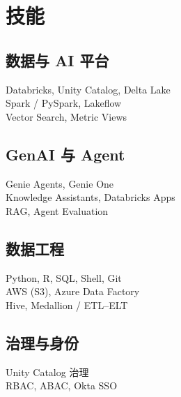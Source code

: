 \documentclass[letterpaper]{deedy-resume}
\begin{document}


\begin{minipage}[t]{0.33\textwidth}

\section{技能}
\vspace{1mm}

\subsection{数据与 AI 平台}
Databricks, Unity Catalog, Delta Lake \\
Spark / PySpark, Lakeflow \\
Vector Search, Metric Views

\sectionspace

\subsection{GenAI 与 Agent}
Genie Agents, Genie One \\
Knowledge Assistants, Databricks Apps \\
RAG, Agent Evaluation

\sectionspace

\subsection{数据工程}
Python, R, SQL, Shell, Git \\
AWS (S3), Azure Data Factory \\
Hive, Medallion / ETL--ELT

\sectionspace

\subsection{治理与身份}
Unity Catalog 治理 \\
RBAC, ABAC, Okta SSO

\sectionspace


\end{minipage}
\end{document}
